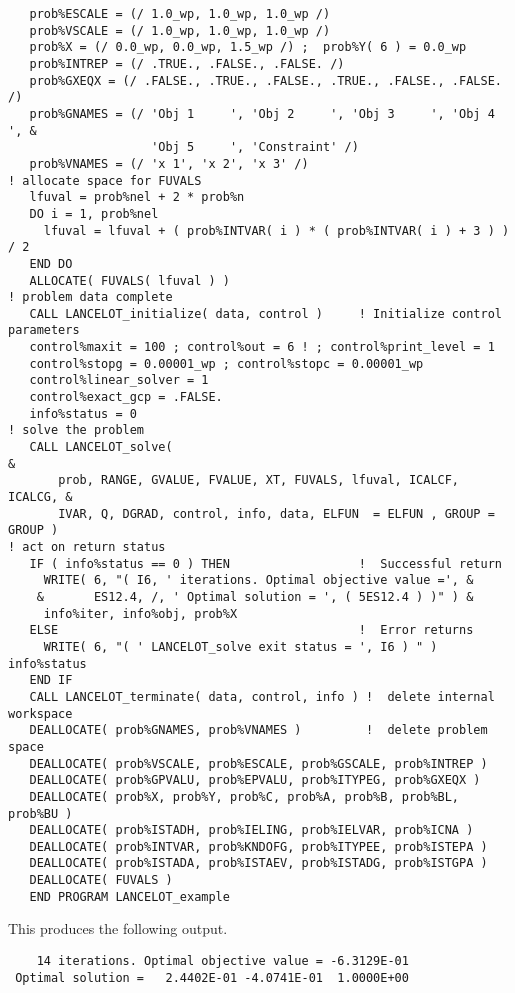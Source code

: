 \documentclass{galahad}
\begin{document}
{{\begin{verbatim}
   prob%ESCALE = (/ 1.0_wp, 1.0_wp, 1.0_wp /)
   prob%VSCALE = (/ 1.0_wp, 1.0_wp, 1.0_wp /)
   prob%X = (/ 0.0_wp, 0.0_wp, 1.5_wp /) ;  prob%Y( 6 ) = 0.0_wp
   prob%INTREP = (/ .TRUE., .FALSE., .FALSE. /)
   prob%GXEQX = (/ .FALSE., .TRUE., .FALSE., .TRUE., .FALSE., .FALSE. /)
   prob%GNAMES = (/ 'Obj 1     ', 'Obj 2     ', 'Obj 3     ', 'Obj 4     ', &
                    'Obj 5     ', 'Constraint' /)
   prob%VNAMES = (/ 'x 1', 'x 2', 'x 3' /)
! allocate space for FUVALS
   lfuval = prob%nel + 2 * prob%n
   DO i = 1, prob%nel
     lfuval = lfuval + ( prob%INTVAR( i ) * ( prob%INTVAR( i ) + 3 ) ) / 2
   END DO
   ALLOCATE( FUVALS( lfuval ) )
! problem data complete
   CALL LANCELOT_initialize( data, control )     ! Initialize control parameters
   control%maxit = 100 ; control%out = 6 ! ; control%print_level = 1
   control%stopg = 0.00001_wp ; control%stopc = 0.00001_wp
   control%linear_solver = 1
   control%exact_gcp = .FALSE.
   info%status = 0
! solve the problem
   CALL LANCELOT_solve(                                                 &
       prob, RANGE, GVALUE, FVALUE, XT, FUVALS, lfuval, ICALCF, ICALCG, &
       IVAR, Q, DGRAD, control, info, data, ELFUN  = ELFUN , GROUP = GROUP )
! act on return status
   IF ( info%status == 0 ) THEN                  !  Successful return
     WRITE( 6, "( I6, ' iterations. Optimal objective value =', &
    &       ES12.4, /, ' Optimal solution = ', ( 5ES12.4 ) )" ) &
     info%iter, info%obj, prob%X
   ELSE                                          !  Error returns
     WRITE( 6, "( ' LANCELOT_solve exit status = ', I6 ) " ) info%status
   END IF
   CALL LANCELOT_terminate( data, control, info ) !  delete internal workspace
   DEALLOCATE( prob%GNAMES, prob%VNAMES )         !  delete problem space
   DEALLOCATE( prob%VSCALE, prob%ESCALE, prob%GSCALE, prob%INTREP )
   DEALLOCATE( prob%GPVALU, prob%EPVALU, prob%ITYPEG, prob%GXEQX )
   DEALLOCATE( prob%X, prob%Y, prob%C, prob%A, prob%B, prob%BL, prob%BU )
   DEALLOCATE( prob%ISTADH, prob%IELING, prob%IELVAR, prob%ICNA )
   DEALLOCATE( prob%INTVAR, prob%KNDOFG, prob%ITYPEE, prob%ISTEPA )
   DEALLOCATE( prob%ISTADA, prob%ISTAEV, prob%ISTADG, prob%ISTGPA )
   DEALLOCATE( FUVALS )
   END PROGRAM LANCELOT_example

\end{verbatim} } }
\def\baselinestretch{1.0}

\noindent
This produces the following output.

\def\baselinestretch{0.8}
{%
{\tt \begin{verbatim}
    14 iterations. Optimal objective value = -6.3129E-01
 Optimal solution =   2.4402E-01 -4.0741E-01  1.0000E+00
\end{verbatim} } }
\def\baselinestretch{1.0}
\end{document}
